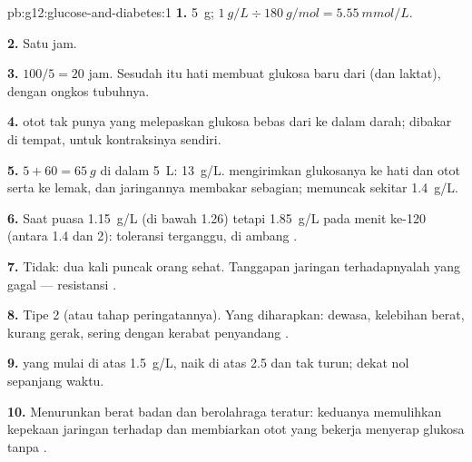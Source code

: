 \begin{solution}{pb:g12:glucose-and-diabetes:1}
\textbf{1.} \qty{5}{g}; $\qty{1}{g/L} \div \qty{180}{g/mol} = \qty{5.55}{mmol/L}$.

\textbf{2.} Satu jam.

\textbf{3.} $100/5 = 20$ jam. Sesudah itu hati membuat glukosa baru
dari  (dan laktat), dengan ongkos  tubuhnya.

\textbf{4.}  otot tak punya  yang melepaskan glukosa bebas dari
 ke dalam darah;  dibakar di tempat, untuk
kontraksinya sendiri.

\textbf{5.} $5 + 60 = \qty{65}{g}$ di dalam \qty{5}{L}: \qty{13}{g/L}.
 mengirimkan glukosanya ke  hati dan otot serta ke
lemak, dan jaringannya membakar sebagian;  memuncak sekitar
\qty{1.4}{g/L}.

\textbf{6.} Saat puasa \qty{1.15}{g/L} (di bawah 1.26) tetapi
\qty{1.85}{g/L} pada menit ke-120 (antara 1.4 dan 2): toleransi
terganggu, di ambang .

\textbf{7.} Tidak:  dua kali puncak orang sehat. Tanggapan
jaringan terhadapnyalah yang gagal --- resistansi .

\textbf{8.} Tipe 2 (atau tahap peringatannya). Yang diharapkan: dewasa,
kelebihan berat, kurang gerak, sering dengan kerabat penyandang .

\textbf{9.}  yang mulai di atas \qty{1.5}{g/L}, naik di atas
\num{2.5} dan tak turun;  dekat nol sepanjang waktu.

\textbf{10.} Menurunkan berat badan dan berolahraga teratur: keduanya
memulihkan kepekaan jaringan terhadap  dan membiarkan otot yang
bekerja menyerap glukosa tanpa .


\end{solution}
